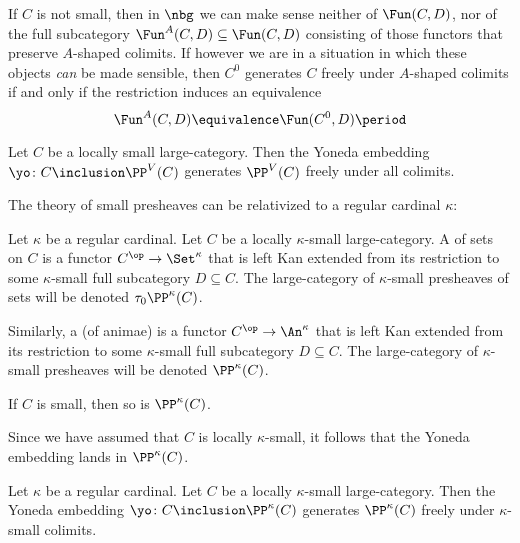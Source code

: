 \begin{remark}
	If $ C $ is not small, then in $ \nbg $
	we can make sense neither of $ \Fun(C,D) $,
	nor of the full subcategory
	$ \Fun^{A}(C, D) \subseteq \Fun(C,D) $
	consisting of those functors that preserve
	$ A $-shaped colimits.
	If however we are in a situation in which
	these objects \emph{can} be made sensible,
	then $ C^0 $ generates $ C $ freely under
	$ A $-shaped colimits
	if and only if the restriction induces an equivalence
	\[ \Fun^A(C, D) \equivalence \Fun(C^0, D) \period \]
\end{remark}

\begin{proposition}%
	\label{prp:PPsmisfreelygenerated}
	Let $ C $ be a locally small large-category.
	Then the Yoneda embedding
	$ \yo \colon C \inclusion \PP^V(C) $
	generates $ \PP^V(C) $ freely under all colimits.
\end{proposition}

The theory of small presheaves can be relativized
to a regular cardinal $ \kappa $:

\begin{definition}
	Let $ \kappa $ be a regular cardinal.
	Let $ C $ be a locally $ \kappa $-small large-category.
	A  of sets on $ C $
	is a functor $ C^{\op} \to \Set^{\kappa} $
	that is left Kan extended from its restriction to
	some $ \kappa $-small full subcategory $ D \subseteq C $.
	The large-category of $ \kappa $-small presheaves of sets
	will be denoted $ \tau_0\PP^{\kappa}(C) $.

	Similarly, a 
	(of animae) is a functor $ C^{\op} \to \An^{\kappa} $
	that is left Kan extended from its restriction to 
	some $ \kappa $-small full subcategory $ D \subseteq C $.
	The large-category of $ \kappa $-small presheaves
	will be denoted $ \PP^{\kappa}(C) $.
\end{definition}

\begin{nul}
	If $ C $ is small, then so is $ \PP^{\kappa}(C) $.

	Since we have assumed that $ C $ is locally $ \kappa $-small,
	it follows that the Yoneda embedding lands in $ \PP^{\kappa}(C) $.
\end{nul}

\begin{proposition}%
	\label{prp:PPkappaisfreelygenerated}
	Let $ \kappa $ be a regular cardinal.
	Let $ C $ be a locally $\kappa$-small large-category.
	Then the Yoneda embedding
	$ \yo \colon C \inclusion \PP^{\kappa}(C) $
	generates $ \PP^{\kappa}(C) $ freely under
	$ \kappa $-small colimits.
\end{proposition}

